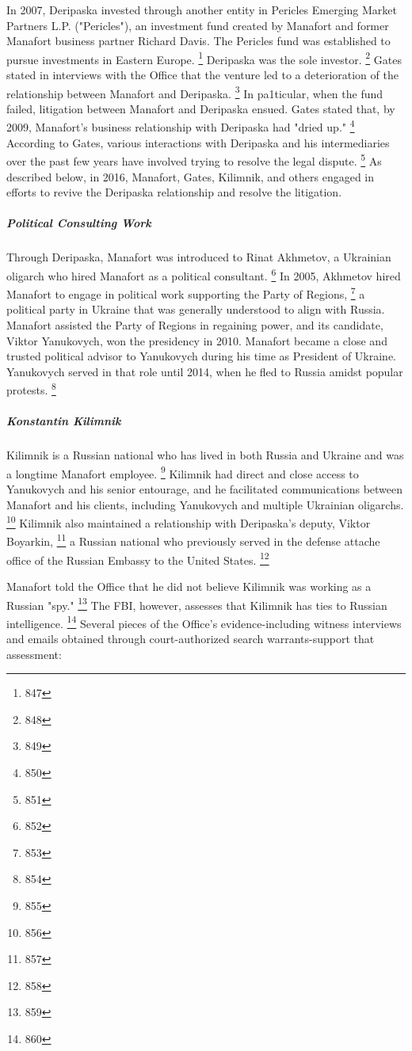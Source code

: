 In 2007, Deripaska invested through another entity in Pericles Emerging Market Partners L.P. ("Pericles"), an investment fund created by Manafort and former Manafort business partner Richard Davis.
The Pericles fund was established to pursue investments in Eastern Europe.%
\footnote{847}
Deripaska was the sole investor.%
\footnote{848}
Gates stated in interviews with the Office that the venture led to a deterioration of the relationship between Manafort and Deripaska.%
\footnote{849}
In pa1ticular, when the fund failed, litigation between Manafort and Deripaska ensued.
Gates stated that, by 2009, Manafort's business relationship with Deripaska had "dried up."%
\footnote{850}
According to Gates, various interactions with Deripaska and his intermediaries over the past few years have involved trying to resolve the legal dispute.%
\footnote{851}
As described below, in 2016, Manafort, Gates, Kilimnik, and others engaged in efforts to revive the Deripaska relationship and resolve the litigation.

\subparagraph{Political Consulting Work}

Through Deripaska, Manafort was introduced to Rinat Akhmetov, a Ukrainian oligarch who hired Manafort as a political consultant.%
\footnote{852}
In 2005, Akhmetov hired Manafort to engage in political work supporting the Party of Regions,%
\footnote{853}
a political party in Ukraine that was generally understood to align with Russia.
Manafort assisted the Party of Regions in regaining power, and its candidate, Viktor Yanukovych, won the presidency in 2010.
Manafort became a close and trusted political advisor to Yanukovych during his time as President of Ukraine.
Yanukovych served in that role until 2014, when he fled to Russia amidst popular protests.%
\footnote{854}

\subparagraph{Konstantin Kilimnik}

Kilimnik is a Russian national who has lived in both Russia and Ukraine and was a longtime Manafort employee.%
\footnote{855}
Kilimnik had direct and close access to Yanukovych and his senior entourage, and he facilitated communications between Manafort and his clients, including Yanukovych and multiple Ukrainian oligarchs.%
\footnote{856}
Kilimnik also maintained a relationship with Deripaska's deputy, Viktor Boyarkin,%
\footnote{857}
a Russian national who previously served in the defense attache office of the Russian Embassy to the United States.%
\footnote{858}

Manafort told the Office that he did not believe Kilimnik was working as a Russian "spy."%
\footnote{859}
The FBI, however, assesses that Kilimnik has ties to Russian intelligence.%
\footnote{860}
Several pieces of the Office's evidence-including witness interviews and emails obtained through court-authorized search warrants-support that assessment:

